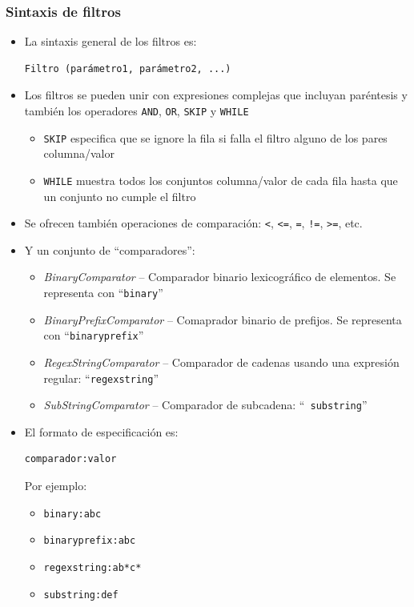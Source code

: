 \documentclass[14pt]{beamer}
\begin{document}
\begin{frame}
  \frametitle{Sintaxis de filtros}
  \begin{itemize}
  \item La sintaxis general de los filtros es:

\begin{verbatim}
Filtro (parámetro1, parámetro2, ...)
\end{verbatim}

  \item Los filtros se pueden unir con expresiones complejas que incluyan
    paréntesis y también los operadores {\tt AND}, {\tt OR}, {\tt SKIP} y
    {\tt WHILE}
    \begin{itemize}
    \item {\tt SKIP} especifica que se ignore la fila si falla el filtro
      alguno de los pares columna/valor
    \item {\tt WHILE} muestra todos los conjuntos columna/valor de cada
      fila hasta que un conjunto no cumple el filtro
    \end{itemize}

  \item Se ofrecen también operaciones de comparación: \verb|<|, \verb|<=|,
    \verb|=|, \verb|!=|, \verb|>=|, etc.

\framebreak

  \item Y un conjunto de ``comparadores'':

    \begin{itemize}
    \item {\em BinaryComparator} -- Comparador binario lexicográfico de
      elementos. Se representa con ``{\tt binary}''
    \item {\em BinaryPrefixComparator} -- Comaprador binario de prefijos.
      Se representa con ``{\tt binaryprefix}''
    \item {\em RegexStringComparator} -- Comparador de cadenas usando una
      expresión regular: ``{\tt regexstring}''
    \item {\em SubStringComparator} -- Comparador de subcadena: ``{\tt
        substring}''
    \end{itemize}

\framebreak

  \item El formato de especificación es:

\begin{verbatim}
comparador:valor
\end{verbatim}

    Por ejemplo:

    \begin{itemize}
    \item {\tt binary:abc}
    \item {\tt binaryprefix:abc}
    \item {\tt regexstring:ab*c*}
    \item {\tt substring:def}
    \end{itemize}

  \end{itemize}
\end{frame}
\end{document}
